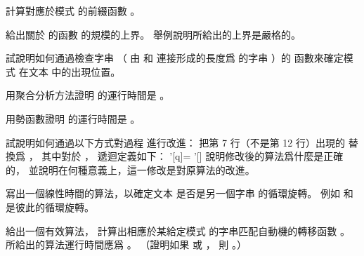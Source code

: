 \startsection[
  title={The Knuth-Morris-Pratt algorithm},
]

\startEXERCISE
計算對應於模式  的前綴函數 \m{\pi}。
\stopEXERCISE

\startANSWER
{}
\stopANSWER

\startEXERCISE
給出關於  的函數 \m{\pi^*[q]} 的規模的上界。
舉例說明所給出的上界是嚴格的。
\stopEXERCISE

\startANSWER
{}
\stopANSWER

\startEXERCISE
試說明如何通過檢查字串  （
由  和  連接形成的長度爲  的字串
）的 \m{\pi} 函數來確定模式  在文本  中的出現位置。
\stopEXERCISE

\startANSWER
{}
\stopANSWER

\startEXERCISE
用聚合分析方法證明  的運行時間是 。
\stopEXERCISE

\startANSWER
{}
\stopANSWER

\startEXERCISE
用勢函數證明  的運行時間是 。
\stopEXERCISE

\startANSWER
{}
\stopANSWER

\startEXERCISE
試說明如何通過以下方式對過程  進行改進：
把第 7 行（不是第 12 行）出現的 \m{\pi} 替換爲 ，
其中對於 ，  遞迴定義如下：
\startformula
\pi'[q]=\startcases
{} \NC {} \NR
\NC \pi'[\pi[q]] \NC {} \NR
\NC \pi[q] \NC {} \NR
\stopcases
\stopformula
說明修改後的算法爲什麼是正確的，
並說明在何種意義上，這一修改是對原算法的改進。
\stopEXERCISE

\startANSWER
{}
\stopANSWER

\startEXERCISE
寫出一個線性時間的算法，以確定文本  是否是另一個字串  的循環旋轉。
例如  和  是彼此的循環旋轉。
\stopEXERCISE

\startANSWER
{}
\stopANSWER

\startEXERCISE\DIFFICULT
給出一個有效算法，
計算出相應於某給定模式  的字串匹配自動機的轉移函數 \m{\delta}。
所給出的算法運行時間應爲 。
（\hint 證明如果  或 ，
則 。）
\stopEXERCISE

\startANSWER
{}
\stopANSWER

\stopsection
